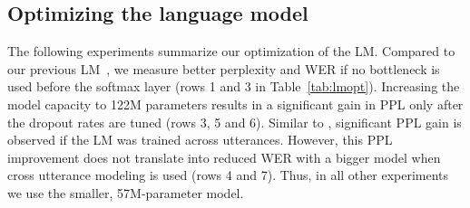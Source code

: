 \documentclass[a4paper]{article}
\begin{document}
\subsection{Optimizing the language model}
\label{sec:optlm}
The following experiments summarize our optimization of the LM.
Compared to our previous LM~\cite{Saon2019}, we measure better perplexity and WER if no bottleneck is used before the softmax layer (rows 1 and 3 in Table~\ref{tab:lmopt}).
Increasing the model capacity to 122M parameters results in a significant gain in PPL only after the dropout rates are tuned (rows 3, 5 and 6).
Similar to \cite{Tuske2018,Xiong2018}, significant PPL gain is observed if the LM was trained across utterances.
However, this PPL improvement does not translate into reduced WER with a bigger model when cross utterance modeling is used (rows 4 and 7).
Thus, in all other experiments we use the smaller, 57M-parameter model.
\end{document}
